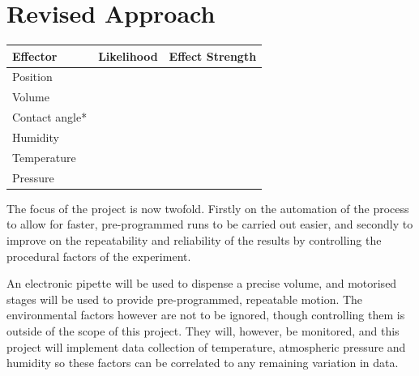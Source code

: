 \section{Revised Approach}
\begin{table}[h]
    \centering
    \begin{tabular}{|l|l|l|}
    \hline
    \textbf{Effector} & \textbf{Likelihood} & \textbf{Effect Strength}\\ \hline
    Position          &                    &                          \\ \hline
    Volume            &                    &                          \\ \hline
    Contact angle*    &                    &                          \\ \hline
    Humidity          &                    &                          \\ \hline
    Temperature       &                    &                          \\ \hline
    Pressure          &                    &                          \\ \hline
\end{tabular}
\end{table}

The focus of the project is now twofold. Firstly on the automation of the process to allow for faster, pre-programmed runs to be carried out easier, and secondly to improve on the repeatability and reliability of the results by controlling the procedural factors of the experiment. 

An electronic pipette will be used to dispense a precise volume, and motorised stages will be used to provide pre-programmed, repeatable motion. The environmental factors however are not to be ignored, though controlling them is outside of the scope of this project. They will, however, be monitored, and this project will implement data collection of temperature, atmospheric pressure and humidity so these factors can be correlated to any remaining variation in data.